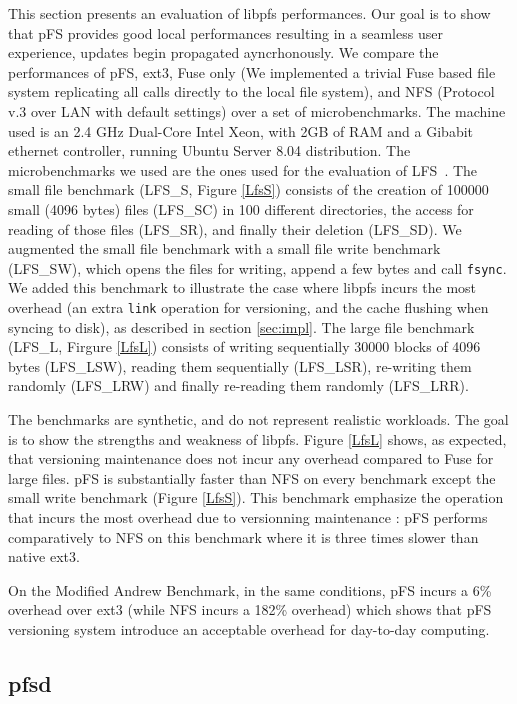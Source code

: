 This section presents an evaluation of libpfs performances. Our goal
is to show that pFS provides good local performances resulting in a
seamless user experience, updates begin propagated ayncrhonously. We
compare the performances of pFS, ext3, Fuse only (We implemented a
trivial Fuse based file system replicating all calls directly to the
local file system), and NFS (Protocol v.3 over LAN with default
settings) over a set of microbenchmarks. The machine used is an 2.4
GHz Dual-Core Intel Xeon, with 2GB of RAM and a Gibabit ethernet
controller, running Ubuntu Server 8.04 distribution. The
microbenchmarks we used are the ones used for the evaluation of
LFS~\cite{rosenblum:lfs}. The small file benchmark (LFS\_S, Figure
\ref{LfsS}) consists of the creation of 100000 small (4096 bytes)
files (LFS\_SC) in 100 different directories, the access for reading
of those files (LFS\_SR), and finally their deletion (LFS\_SD). We
augmented the small file benchmark with a small file write benchmark
(LFS\_SW), which opens the files for writing, append a few bytes and
call {\tt fsync}.  We added this benchmark to illustrate the case where
libpfs incurs the most overhead (an extra {\tt link} operation for
versioning, and the cache flushing when syncing to disk), as described in
section \ref{sec:impl}. The large file benchmark (LFS\_L, Firgure
\ref{LfsL}) consists of writing sequentially 30000 blocks of 4096
bytes (LFS\_LSW), reading them sequentially (LFS\_LSR), re-writing
them randomly (LFS\_LRW) and finally re-reading them randomly
(LFS\_LRR).

The benchmarks are synthetic, and do not represent realistic
workloads. The goal is to show the strengths and weakness of
libpfs. Figure \ref{LfsL} shows, as expected, that versioning
maintenance does not incur any overhead compared to Fuse for large
files. pFS is substantially faster than NFS on every benchmark except
the small write benchmark (Figure \ref{LfsS}). This benchmark
emphasize the operation that incurs the most overhead due to
versionning maintenance : pFS performs comparatively to NFS on this
benchmark where it is three times slower than native ext3.

On the Modified Andrew Benchmark, in the same conditions, pFS incurs a
6\% overhead over ext3 (while NFS incurs a 182\% overhead) which shows
that pFS versioning system introduce an acceptable overhead for
day-to-day computing.

\subsection{pfsd}


